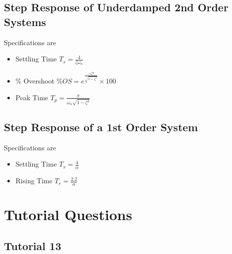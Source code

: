 \documentclass[oneside]{book}
\begin{document}
        \section{Step Response of Underdamped 2nd Order Systems}
            Specifications are 
            \begin{itemize}
                \item Settling Time
                    \subitem $T_s = \frac{4}{\zeta\omega_n}$
                \item \% Overshoot
                    \subitem $\%OS= e^{\frac{-\zeta\pi}{\sqrt{1 - \zeta^2}}}\times 100$
                \item Peak Time
                    \subitem $T_p = \frac{\pi}{\omega_n \sqrt{1 - \zeta^2}}$
            \end{itemize}
        \section{Step Response of a 1st Order System}
            Specifications are
            \begin{itemize}
                \item Settling Time
                    \subitem $T_s = \frac{4}{\alpha}$
                \item Rising Time
                    \subitem $T_r = \frac{2.2}{\alpha}$
            \end{itemize}
    \chapter{Tutorial Questions}
        \section{Tutorial 13}
\end{document}
